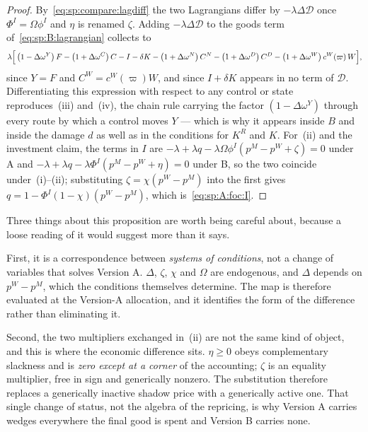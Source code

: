 \begin{proof}
By~\eqref{eq:sp:compare:lagdiff} the two Lagrangians differ by $-\lambda\Delta\mathcal D$ once
$\Phi^I=\Omega\phi^I$ and $\eta$ is renamed $\zeta$. Adding $-\lambda\Delta\mathcal D$ to the goods
term of~\eqref{eq:sp:B:lagrangian} collects to
\begin{align}
\lambda\Big[\left(1-\Delta\omega^Y\right)F-\left(1+\Delta\omega^C\right)C-I-\delta K
-\left(1+\Delta\omega^N\right)C^N-\left(1+\Delta\omega^D\right)C^D
-\left(1+\Delta\omega^W\right)c^W\!\left(\varpi\right)W\Big],
\notag
\end{align}
since $Y=F$ and $C^W=c^W(\varpi)W$, and since $I+\delta K$ appears in no term of $\mathcal D$.
Differentiating this expression with respect to any control or state reproduces~(iii) and~(iv), the
chain rule carrying the factor $\left(1-\Delta\omega^Y\right)$ through every route by which a control
moves $Y$ --- which is why it appears inside $B$ and inside the damage $d$ as well as in the
conditions for $K^R$ and $K$. For~(ii) and the investment claim, the terms in $I$
are $-\lambda+\lambda q-\lambda\Omega\phi^I\left(p^M-p^W+\zeta\right)=0$ under A and
$-\lambda+\lambda q-\lambda\Phi^I\left(p^M-p^W+\eta\right)=0$ under B, so the two coincide
under~(i)--(ii); substituting $\zeta=\chi\left(p^W-p^M\right)$ into the first gives
$q=1-\Phi^I\left(1-\chi\right)\left(p^W-p^M\right)$, which is~\eqref{eq:sp:A:foc:I}.
\end{proof}

Three things about this proposition are worth being careful about, because a loose reading of it
would suggest more than it says.

First, it is a correspondence between \emph{systems of conditions}, not a change of variables that
solves Version A. $\Delta$, $\zeta$, $\chi$ and $\Omega$ are endogenous, and $\Delta$ depends on
$p^W-p^M$, which the conditions themselves determine. The map is therefore evaluated at the Version-A
allocation, and it identifies the form of the difference rather than eliminating it.

Second, the two multipliers exchanged in~(ii) are not the same kind of object, and this is where the
economic difference sits. $\eta\ge0$ obeys complementary slackness and is \emph{zero except at a
corner} of the accounting; $\zeta$ is an equality multiplier, free in sign and generically nonzero.
The substitution therefore replaces a generically inactive shadow price with a generically active
one. That single change of status, not the algebra of the repricing, is why Version A carries wedges
everywhere the final good is spent and Version B carries none.


